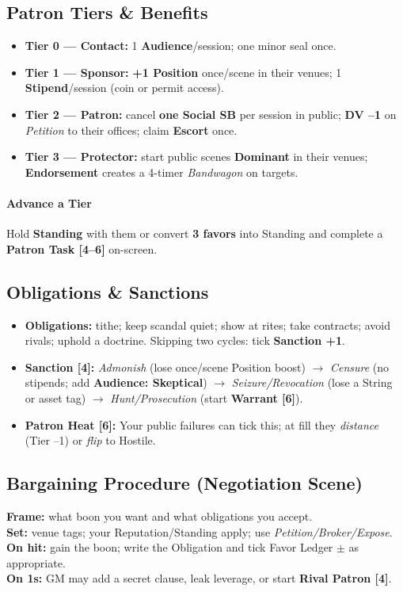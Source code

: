 \documentclass[10pt]{article}
\begin{document}
    \subsection{Patron Tiers \& Benefits}
    \begin{itemize}
      \item \textbf{Tier 0 --- Contact:} 1 \textbf{Audience}/session; one minor seal once.
      \item \textbf{Tier 1 --- Sponsor:} \textbf{+1 Position} once/scene in their venues; 1 \textbf{Stipend}/session (coin or permit access).
      \item \textbf{Tier 2 --- Patron:} cancel \textbf{one Social SB} per session in public; \textbf{DV --1} on \emph{Petition} to their offices; claim \textbf{Escort} once.
      \item \textbf{Tier 3 --- Protector:} start public scenes \textbf{Dominant} in their venues; \textbf{Endorsement} creates a 4-timer \emph{Bandwagon} on targets.
    \end{itemize}
    \paragraph{Advance a Tier} Hold \textbf{Standing} with them or convert \textbf{3 favors} into Standing and complete a \textbf{Patron Task [4--6]} on-screen.
    
    \subsection{Obligations \& Sanctions}
    \begin{itemize}
      \item \textbf{Obligations:} tithe; keep scandal quiet; show at rites; take contracts; avoid rivals; uphold a doctrine. Skipping two cycles: tick \textbf{Sanction +1}.
      \item \textbf{Sanction [4]:} \emph{Admonish} (lose once/scene Position boost) $\to$ \emph{Censure} (no stipends; add \textbf{Audience: Skeptical}) $\to$ \emph{Seizure/Revocation} (lose a String or asset tag) $\to$ \emph{Hunt/Prosecution} (start \textbf{Warrant [6]}).
      \item \textbf{Patron Heat [6]:} Your public failures can tick this; at fill they \emph{distance} (Tier --1) or \emph{flip} to Hostile.
    \end{itemize}
    
    \subsection{Bargaining Procedure (Negotiation Scene)}
    \textbf{Frame:} what boon you want and what obligations you accept.\\
    \textbf{Set:} venue tags; your Reputation/Standing apply; use \emph{Petition/Broker/Expose}.\\
    \textbf{On hit:} gain the boon; write the Obligation and tick Favor Ledger $\pm$ as appropriate.\\
    \textbf{On 1s:} GM may add a secret clause, leak leverage, or start \textbf{Rival Patron [4]}.
    
\end{document}
